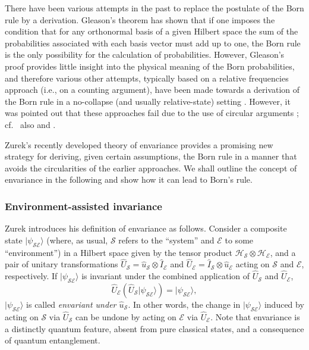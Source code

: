\documentclass[twocolumn,rmp,aps,amsmath,amsfonts,noshowkeys,noshowpacs]{revtex4}
\newcommand{\cf}{cf.\ }
\newcommand{\ket}[1]{\ensuremath{|{#1\rangle}}}
\begin{document}
There have been various attempts in the past to replace the postulate
of the Born rule by a derivation. Gleason's
\citeyearpar{Gleason:1957:zp} theorem has shown that if one imposes
the condition that for any orthonormal basis of a given Hilbert space
the sum of the probabilities associated with each basis vector must
add up to one, the Born rule is the only possibility for the
calculation of probabilities. However, Gleason's proof provides little
insight into the physical meaning of the Born probabilities,
and therefore various other attempts, typically based on a relative
frequencies approach (i.e., on a counting argument), have been made
towards a derivation of the Born rule in a no-collapse (and usually
relative-state) setting \citep[see, for
example,][]{Everett:1957:rw,DeWitt:1973:pz,Hartle:1968:gg,DeWitt:1971:pz,%
  Graham:1973:ww,Geroch:1984:yt,Farhi:1989:uh,Deutsch:1999:tz}.
However, it was pointed out that these approaches fail due to the use
of circular arguments
\citep{Stein:1984:uu,Kent:1990:nm,Squires:1990:lz,Barnum:2000:oz}; \cf
also \citet{Wallace:2003:zr} and \citet{Saunders:2002:tz}.

Zurek's recently developed theory of envariance provides a promising
new strategy for deriving, given certain assumptions, the Born rule in
a manner that avoids the circularities of the earlier approaches.  We
shall outline the concept of envariance in the following and show how
it can lead to Born's rule.


\subsubsection{Environment-assisted invariance}

Zurek introduces his definition of envariance as follows. Consider a
composite state $\ket{\psi_\mathcal{SE}}$ (where, as usual,
$\mathcal{S}$ refers to the ``system'' and $\mathcal{E}$ to some
``environment'') in a Hilbert space given by the tensor product
$\mathcal{H}_\mathcal{S} \otimes \mathcal{H}_\mathcal{E}$, and a pair
of unitary transformations $\widehat{U}_\mathcal{S} =
\widehat{u}_\mathcal{S} \otimes \widehat{I}_\mathcal{E}$ and
$\widehat{U}_\mathcal{E} = \widehat{I}_\mathcal{S} \otimes
\widehat{u}_\mathcal{E}$ acting on $\mathcal{S}$ and $\mathcal{E}$,
respectively.  If $\ket{\psi_\mathcal{SE}}$ is invariant under the
combined application of $\widehat{U}_\mathcal{S}$ and
$\widehat{U}_\mathcal{E}$,
%
\begin{equation} \label{eq:envar}
\widehat{U}_\mathcal{E} (\widehat{U}_\mathcal{S} 
\ket{\psi_\mathcal{SE}}) = \ket{\psi_\mathcal{SE}},
\end{equation}
%
$\ket{\psi_\mathcal{SE}}$ is called \emph{envariant under
  $\widehat{u}_\mathcal{S}$}. In other words, the change in
$\ket{\psi_\mathcal{SE}}$ induced by acting on $\mathcal{S}$ via
$\widehat{U}_\mathcal{S}$ can be undone by acting on $\mathcal{E}$ via
$\widehat{U}_\mathcal{E}$.  Note that envariance is a distinctly
quantum feature, absent from pure classical states, and a consequence
of quantum entanglement.
\end{document}
